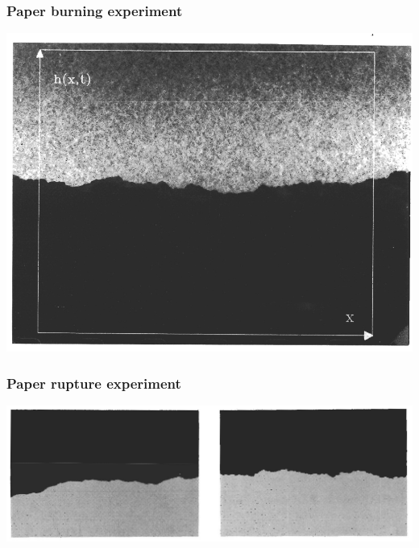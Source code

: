\documentclass[9pt,table,xcolor=dvipsnames]{beamer}
\begin{document}
\begin{frame}[fragile] %
  \frametitle{Paper burning experiment}

  \begin{center}
    \includegraphics[scale=0.25]{./figs/Figure_1-3_Paper_Fire.png}
  \end{center}

\end{frame}
\begin{frame}[fragile] %
  \frametitle{Paper rupture experiment}

  \begin{center}
    \includegraphics[scale=0.24]{./figs/Figure_11-8_Paper_Rupture.png}
  \end{center}

\end{frame}
\end{document}
